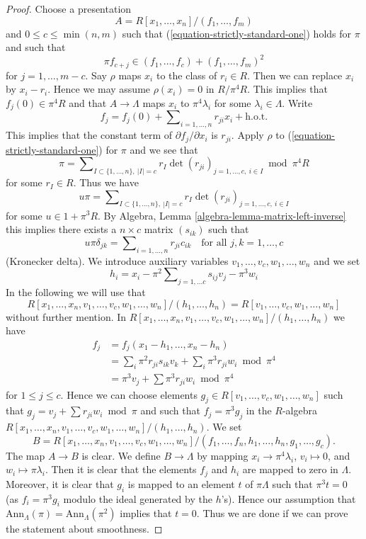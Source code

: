 \begin{proof}
Choose a presentation
$$
A = R[x_1, \ldots, x_n]/(f_1, \ldots, f_m)
$$
and $0 \leq c \leq \min(n, m)$ such that
(\ref{equation-strictly-standard-one}) holds for $\pi$ and such that
\begin{equation}
\label{equation-star}
\pi f_{c + j} \in (f_1, \ldots, f_c) + (f_1, \ldots, f_m)^2
\end{equation}
for $j = 1, \ldots, m - c$. Say $\rho$ maps $x_i$ to the class of
$r_i \in R$. Then we can replace $x_i$ by $x_i - r_i$. Hence we may
assume $\rho(x_i) = 0$ in $R/\pi^4 R$. This implies that
$f_j(0) \in \pi^4R$ and that $A \to \Lambda$ maps $x_i$
to $\pi^4\lambda_i$ for some $\lambda_i \in \Lambda$. Write
$$
f_j = f_j(0) + \sum\nolimits_{i = 1, \ldots, n} r_{ji} x_i + \text{h.o.t.}
$$
This implies that the constant term of $\partial f_j/\partial x_i$ is
$r_{ji}$. Apply $\rho$ to (\ref{equation-strictly-standard-one})
for $\pi$ and we see that
$$
\pi = \sum\nolimits_{I \subset \{1, \ldots, n\},\ |I| = c}
r_I \det(r_{ji})_{j = 1, \ldots, c,\ i \in I} \bmod \pi^4R
$$
for some $r_I \in R$. Thus we have
$$
u\pi = \sum\nolimits_{I \subset \{1, \ldots, n\},\ |I| = c}
r_I \det(r_{ji})_{j = 1, \ldots, c,\ i \in I}
$$
for some $u \in 1 + \pi^3R$. By
Algebra, Lemma \ref{algebra-lemma-matrix-left-inverse}
this implies there exists a $n \times c$ matrix $(s_{ik})$ such that
$$
u\pi \delta_{jk} = \sum\nolimits_{i = 1, \ldots, n} r_{ji}c_{ik}\quad
\text{for all } j, k = 1, \ldots, c
$$
(Kronecker delta). We introduce auxiliary variables
$v_1, \ldots, v_c, w_1, \ldots, w_n$ and we set
$$
h_i = x_i - \pi^2 \sum\nolimits_{j = 1, \ldots c} s_{ij} v_j - \pi^3 w_i
$$
In the following we will use that
$$
R[x_1, \ldots, x_n, v_1, \ldots, v_c, w_1, \ldots, w_n]/
(h_1, \ldots, h_n) = R[v_1, \ldots, v_c, w_1, \ldots, w_n]
$$
without further mention. In
$R[x_1, \ldots, x_n, v_1, \ldots, v_c, w_1, \ldots, w_n]/
(h_1, \ldots, h_n)$ we have
\begin{align*}
f_j & = f_j(x_1 - h_1, \ldots, x_n - h_n) \\
& = \sum\nolimits_i \pi^2 r_{ji} s_{ik} v_k
+ \sum\nolimits_i \pi^3 r_{ji}w_i \bmod \pi^4 \\
& = \pi^3 v_j + \sum \pi^3 r_{ji}w_i \bmod \pi^4
\end{align*}
for $1 \leq j \leq c$. Hence we can choose elements
$g_j \in R[v_1, \ldots, v_c, w_1, \ldots, w_n]$
such that $g_j = v_j + \sum r_{ji}w_i \bmod \pi$
and such that $f_j = \pi^3 g_j$ in the $R$-algebra
$R[x_1, \ldots, x_n, v_1, \ldots, v_c, w_1, \ldots, w_n]/
(h_1, \ldots, h_n)$. We set
$$
B = R[x_1, \ldots, x_n, v_1, \ldots, v_c, w_1, \ldots, w_n]/
(f_1, \ldots, f_n, h_1, \ldots, h_n, g_1, \ldots, g_c).
$$
The map $A \to B$ is clear. We define $B \to \Lambda$ by mapping
$x_i \to \pi^4\lambda_i$, $v_i \mapsto 0$, and $w_i \mapsto \pi \lambda_i$.
Then it is clear that the elements $f_j$ and $h_i$ are mapped to zero
in $\Lambda$. Moreover, it is clear that $g_i$ is mapped to an element
$t$ of $\pi\Lambda$ such that $\pi^3t = 0$ (as $f_i = \pi^3 g_i$ modulo
the ideal generated by the $h$'s). Hence our assumption that
$\text{Ann}_\Lambda(\pi) = \text{Ann}_\Lambda(\pi^2)$ implies that $t = 0$.
Thus we are done if we can prove the statement about smoothness.


\end{proof}
